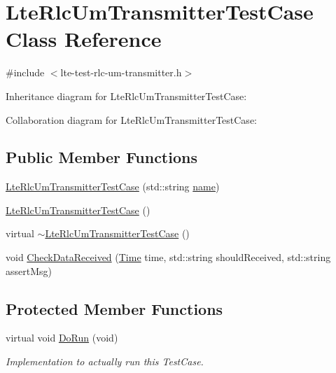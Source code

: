 \hypertarget{classLteRlcUmTransmitterTestCase}{}\section{Lte\+Rlc\+Um\+Transmitter\+Test\+Case Class Reference}
\label{classLteRlcUmTransmitterTestCase}


{\ttfamily \#include $<$lte-\/test-\/rlc-\/um-\/transmitter.\+h$>$}



Inheritance diagram for Lte\+Rlc\+Um\+Transmitter\+Test\+Case\+:


Collaboration diagram for Lte\+Rlc\+Um\+Transmitter\+Test\+Case\+:
\subsection*{Public Member Functions}
\begin{DoxyCompactItemize}
\item 
\hyperlink{classLteRlcUmTransmitterTestCase_a0fd0592509d362405c6280993c2abb35}{Lte\+Rlc\+Um\+Transmitter\+Test\+Case} (std\+::string \hyperlink{generate__test__data__lte__spectrum__model_8m_ab74e6bf80237ddc4109968cedc58c151}{name})
\item 
\hyperlink{classLteRlcUmTransmitterTestCase_abd5280abd7d43983bc2147f0fdb2932e}{Lte\+Rlc\+Um\+Transmitter\+Test\+Case} ()
\item 
virtual \hyperlink{classLteRlcUmTransmitterTestCase_a6d11423bf7b5aabfa51ec91895bc2098}{$\sim$\+Lte\+Rlc\+Um\+Transmitter\+Test\+Case} ()
\item 
void \hyperlink{classLteRlcUmTransmitterTestCase_a49a8eddf5f0cd36ceab21333be21de7b}{Check\+Data\+Received} (\hyperlink{classns3_1_1Time}{Time} time, std\+::string should\+Received, std\+::string assert\+Msg)
\end{DoxyCompactItemize}
\subsection*{Protected Member Functions}
\begin{DoxyCompactItemize}
\item 
virtual void \hyperlink{classLteRlcUmTransmitterTestCase_aacac9ab10bdcd81740a7222f621ed84e}{Do\+Run} (void)
\begin{DoxyCompactList}\small\item\em Implementation to actually run this Test\+Case. \end{DoxyCompactList}\end{DoxyCompactItemize}
